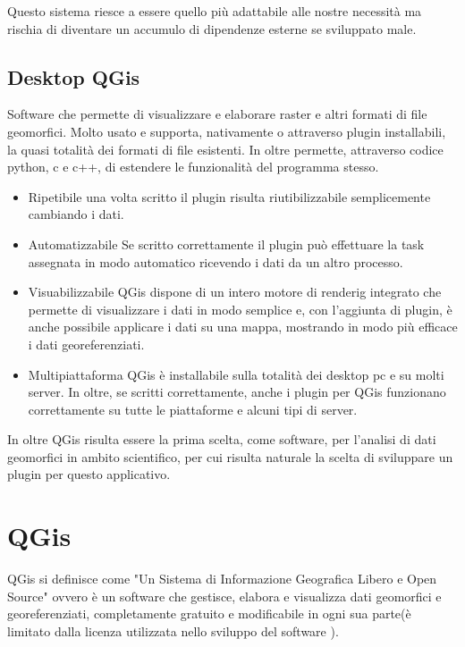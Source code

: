 Questo sistema riesce a essere quello più adattabile alle nostre necessità ma rischia di diventare un accumulo di dipendenze esterne se sviluppato male.

\subsection{Desktop QGis}

Software che permette di visualizzare e elaborare raster e altri formati di file geomorfici. Molto usato e supporta, nativamente o attraverso plugin installabili, la quasi totalità dei formati di file esistenti. In oltre permette, attraverso codice python, c e c++, di estendere le funzionalità del programma stesso.

\begin{itemize}
	\item{Ripetibile} una volta scritto il plugin risulta riutibilizzabile semplicemente cambiando i dati.

	\item{Automatizzabile} Se scritto correttamente il plugin può effettuare la task assegnata in modo automatico ricevendo i dati da un altro processo.

	\item{Visuabilizzabile} QGis dispone di un intero motore di renderig integrato che permette di visualizzare i dati in modo semplice e, con l'aggiunta di plugin, è anche possibile applicare i dati su una mappa, mostrando in modo più efficace i dati georeferenziati.

	\item{Multipiattaforma} QGis è installabile sulla totalità dei desktop pc e su molti server. In oltre, se scritti correttamente, anche i plugin per QGis funzionano correttamente su tutte le piattaforme e alcuni tipi di server.
\end{itemize}

In oltre QGis risulta essere la prima scelta, come software, per l'analisi di dati geomorfici in ambito scientifico, per cui risulta naturale la scelta di sviluppare un plugin per questo applicativo.

\section{QGis}

QGis si definisce come "Un Sistema di Informazione Geografica Libero e Open Source"\cite{site:qgis} ovvero è un software che gestisce, elabora e visualizza dati geomorfici e georeferenziati, completamente gratuito e modificabile in ogni sua parte(è limitato dalla licenza utilizzata nello sviluppo del software \cite{site:cc3}).

